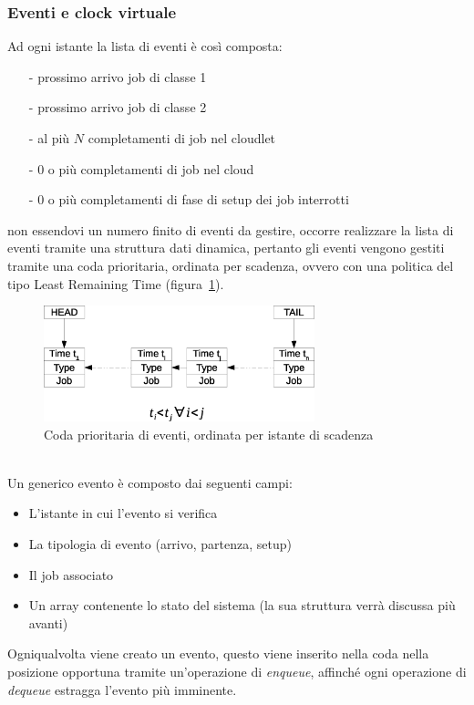 \subsubsection{Eventi e clock virtuale}
Ad ogni istante la lista di eventi è così composta:
\begin{itemize}
\item[-]prossimo arrivo job di classe 1
\item[-]prossimo arrivo job di classe 2
\item[-]al più $N$ completamenti di job nel cloudlet
\item[-]$0$ o più completamenti di job nel cloud
\item[-]$0$ o più completamenti di fase di setup dei job interrotti
\end{itemize}
non essendovi un numero finito di eventi da gestire, occorre realizzare la lista
di eventi tramite una struttura dati dinamica, pertanto gli eventi vengono
gestiti tramite una coda prioritaria, ordinata per scadenza, ovvero con una
politica del tipo Least Remaining Time (figura~\ref{eventq}).
%
\begin{figure}[!h]
\centering
\includegraphics[width=0.7\textwidth]{figures/eventq}
\caption{Coda prioritaria di eventi, ordinata per istante di scadenza}
\label{eventq}
\end{figure}
%
\\Un generico evento è composto dai seguenti campi:
\begin{itemize}
\item L’istante in cui l’evento si verifica
\item La tipologia di evento (arrivo, partenza, setup)
\item Il job associato
\item Un array contenente lo stato del sistema (la sua struttura verrà discussa
più avanti)
\end{itemize}
%
Ogniqualvolta viene creato un evento, questo viene inserito nella coda nella
posizione opportuna tramite un’operazione di \emph{enqueue}, affinché ogni 
operazione di \emph{dequeue} estragga l’evento più imminente.

